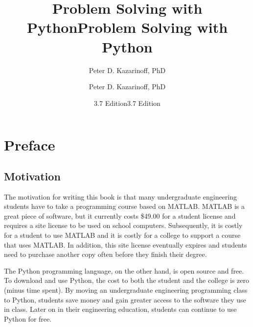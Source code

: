 \documentclass{book}
\title{Problem Solving with Python}
\author{Peter D. Kazarinoff, PhD}
\date{3.7 Edition}
\title{Problem Solving with Python}
\author{Peter D. Kazarinoff, PhD}
\date{3.7 Edition}
\begin{document}
    
    
    
        \maketitle
        
        \newpage
        
        \newpage
        {
        \hypersetup{linkcolor=black}    %
        \tableofcontents
        }
    
    


    

    
        \hypertarget{preface}{%
\chapter*{Preface}\label{preface} 
 } 




    
        \hypertarget{motivation}{%
\section*{Motivation}\label{motivation} 
 }    




    
        The motivation for writing this book is that many undergraduate
engineering students have to take a programming course based on MATLAB.
MATLAB is a great piece of software, but it currently costs \$49.00 for
a student license and requires a site license to be used on school
computers. Subsequently, it is costly for a student to use MATLAB and it
is costly for a college to support a course that uses MATLAB. In
addition, this site license eventually expires and students need to
purchase another copy often before they finish their degree.

The Python programming language, on the other hand, is open source and
free. To download and use Python, the cost to both the student and the
college is zero (minus time spent). By moving an undergraduate
engineering programming class to Python, students save money and gain
greater access to the software they use in class. Later on in their
engineering education, students can continue to use Python for free.
    
\end{document}
